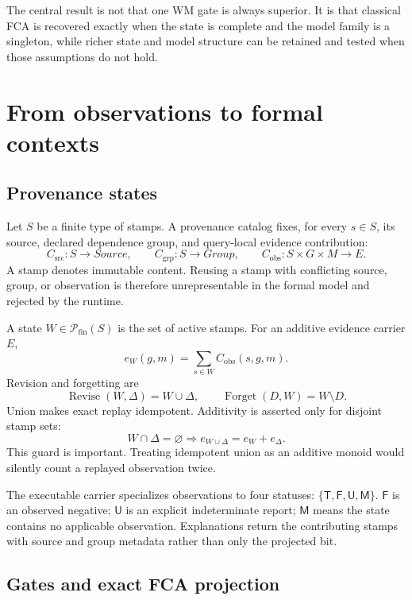 \documentclass[11pt]{article}
\newcommand{\Pow}{\mathcal{P}}
\newcommand{\yes}{\mathsf{T}}
\newcommand{\no}{\mathsf{F}}
\newcommand{\unknown}{\mathsf{U}}
\newcommand{\missing}{\mathsf{M}}
\begin{document}
The central result is not that one WM gate is always superior. It is that
classical FCA is recovered exactly when the state is complete and the model
family is a singleton, while richer state and model structure can be retained
and tested when those assumptions do not hold.

\section{From observations to formal contexts}
\label{sec:semantics}

\subsection{Provenance states}

Let $S$ be a finite type of stamps. A provenance catalog fixes, for every
$s\in S$, its source, declared dependence group, and query-local evidence
contribution:
\[
  C_{\mathrm{src}}:S\to\mathit{Source},\qquad
  C_{\mathrm{grp}}:S\to\mathit{Group},\qquad
  C_{\mathrm{obs}}:S\times G\times M\to E .
\]
A stamp denotes immutable content. Reusing a stamp with conflicting source,
group, or observation is therefore unrepresentable in the formal model and
rejected by the runtime.

A state $W\in\Pow_{\mathrm{fin}}(S)$ is the set of active stamps. For an
additive evidence carrier $E$,
\[
  e_W(g,m)=\sum_{s\in W} C_{\mathrm{obs}}(s,g,m).
\]
Revision and forgetting are
\[
  \operatorname{Revise}(W,\Delta)=W\cup\Delta,\qquad
  \operatorname{Forget}(D,W)=W\setminus D.
\]
Union makes exact replay idempotent. Additivity is asserted only for disjoint
stamp sets:
\[
  W\cap\Delta=\varnothing
  \Longrightarrow
  e_{W\cup\Delta}=e_W+e_\Delta .
\]
This guard is important. Treating idempotent union as an additive monoid would
silently count a replayed observation twice.

The executable carrier specializes observations to four statuses:
$\{\yes,\no,\unknown,\missing\}$. $\no$ is an observed negative;
$\unknown$ is an explicit indeterminate report; $\missing$ means the state
contains no applicable observation. Explanations return the contributing
stamps with source and group metadata rather than only the projected bit.

\subsection{Gates and exact FCA projection}
\end{document}
